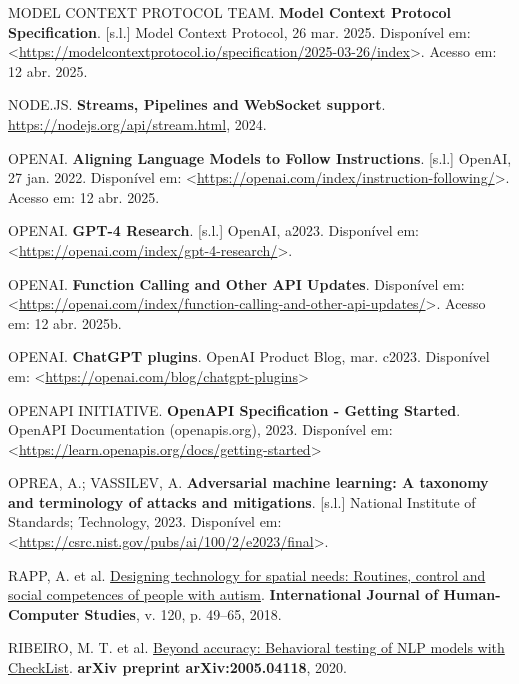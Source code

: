 \documentclass[
]{article}
\newlength{\cslhangindent}
\newenvironment{CSLReferences}[2] %
 {\begin{list}{}{%
  \setlength{\itemindent}{0pt}
  \setlength{\leftmargin}{0pt}
  \setlength{\parsep}{0pt}
  \ifodd #1
   \setlength{\leftmargin}{\cslhangindent}
   \setlength{\itemindent}{-1\cslhangindent}
  \fi
  \setlength{\itemsep}{#2\baselineskip}}}
 {\end{list}}
\begin{document}
\begin{CSLReferences}{0}{1}
MODEL CONTEXT PROTOCOL TEAM. \textbf{Model Context Protocol
Specification}. {[}s.l.{]} Model Context Protocol, 26 mar. 2025.
Disponível em:
\textless{}\url{https://modelcontextprotocol.io/specification/2025-03-26/index}\textgreater.
Acesso em: 12 abr. 2025.

NODE.JS. \textbf{Streams, Pipelines and WebSocket support}.
\url{https://nodejs.org/api/stream.html}, 2024.

OPENAI. \textbf{Aligning Language Models to Follow Instructions}.
{[}s.l.{]} OpenAI, 27 jan. 2022. Disponível em:
\textless{}\url{https://openai.com/index/instruction-following/}\textgreater.
Acesso em: 12 abr. 2025.

OPENAI. \textbf{GPT-4 Research}. {[}s.l.{]} OpenAI, a2023. Disponível
em:
\textless{}\url{https://openai.com/index/gpt-4-research/}\textgreater.

OPENAI. \textbf{Function Calling and Other API Updates}. Disponível em:
\textless{}\url{https://openai.com/index/function-calling-and-other-api-updates/}\textgreater.
Acesso em: 12 abr. 2025b.

OPENAI. \textbf{{ChatGPT plugins}}. OpenAI Product Blog, mar. c2023.
Disponível em:
\textless{}\url{https://openai.com/blog/chatgpt-plugins}\textgreater{}

OPENAPI INITIATIVE. \textbf{{OpenAPI Specification - Getting Started}}.
OpenAPI Documentation (openapis.org), 2023. Disponível em:
\textless{}\url{https://learn.openapis.org/docs/getting-started}\textgreater{}

OPREA, A.; VASSILEV, A. \textbf{Adversarial machine learning: A taxonomy
and terminology of attacks and mitigations}. {[}s.l.{]} National
Institute of Standards; Technology, 2023. Disponível em:
\textless{}\url{https://csrc.nist.gov/pubs/ai/100/2/e2023/final}\textgreater.

RAPP, A. et al.
\href{https://doi.org/10.1016/j.ijhcs.2018.07.005}{Designing technology
for spatial needs: Routines, control and social competences of people
with autism}. \textbf{International Journal of Human-Computer Studies},
v. 120, p. 49--65, 2018.

RIBEIRO, M. T. et al. \href{https://arxiv.org/abs/2005.04118}{Beyond
accuracy: Behavioral testing of NLP models with CheckList}.
\textbf{arXiv preprint arXiv:2005.04118}, 2020.


\end{CSLReferences}
\end{document}
